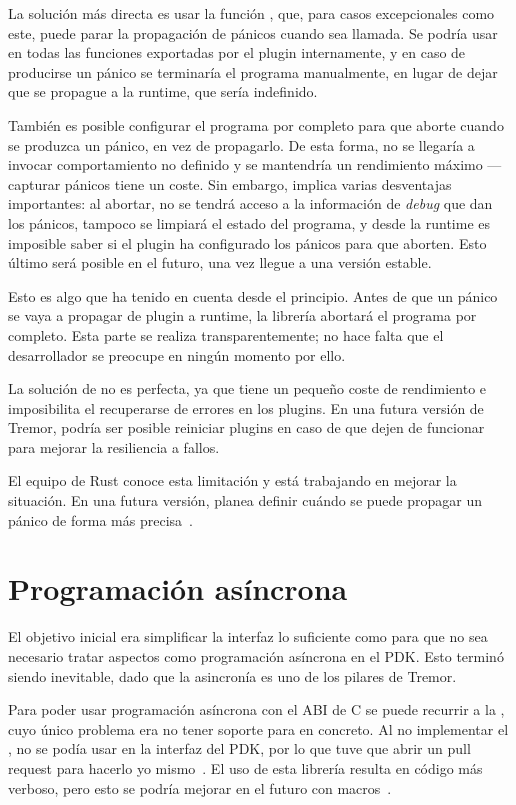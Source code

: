 La solución más directa es usar la función , que,
para casos excepcionales como este, puede parar la propagación de pánicos cuando
sea llamada. Se podría usar en todas las funciones exportadas por el plugin
internamente, y en caso de producirse un pánico se terminaría el programa
manualmente, en lugar de dejar que se propague a la runtime, que sería
indefinido.

También es posible configurar el programa por completo para que aborte cuando se
produzca un pánico, en vez de propagarlo. De esta forma, no se llegaría a
invocar comportamiento no definido y se mantendría un rendimiento máximo ---
capturar pánicos tiene un coste. Sin embargo, implica varias desventajas
importantes: al abortar, no se tendrá acceso a la información de \emph{debug}
que dan los pánicos, tampoco se limpiará el estado del programa, y desde la
runtime es imposible saber si el plugin ha configurado los pánicos para que
aborten. Esto último será posible en el futuro, una vez
\textcite{pluggablepanic} llegue a una versión estable.

Esto es algo que \abistable ha tenido en cuenta desde el principio. Antes de que
un pánico se vaya a propagar de plugin a runtime, la librería abortará el
programa por completo. Esta parte se realiza transparentemente; no hace falta
que el desarrollador se preocupe en ningún momento por ello.

La solución de \abistable no es perfecta, ya que tiene un pequeño coste de
rendimiento e imposibilita el recuperarse de errores en los plugins. En una
futura versión de Tremor, podría ser posible reiniciar plugins en caso de que
dejen de funcionar para mejorar la resiliencia a fallos.

El equipo de Rust conoce esta limitación y está trabajando en mejorar la
situación. En una futura versión, planea definir cuándo se puede propagar un
pánico de forma más precisa~\cite{cunwind}.

\section{Programación asíncrona}

El objetivo inicial era simplificar la interfaz lo suficiente como para que no
sea necesario tratar aspectos como programación asíncrona en el PDK. Esto
terminó siendo inevitable, dado que la asincronía es uno de los pilares de
Tremor.

Para poder usar programación asíncrona con el ABI de C se puede recurrir a la
\crate {}, cuyo único problema era no tener soporte para
\abistable en concreto. Al no implementar el \trait {}, no se
podía usar en la interfaz del PDK, por lo que tuve que abrir un pull request
para hacerlo yo mismo~\cite{asyncfficontrib}. El uso de esta librería resulta en
código más verboso, pero esto se podría mejorar en el futuro con
macros~\cite{asyncffimacro}.

